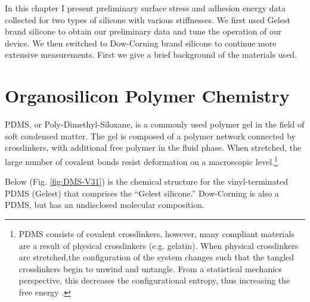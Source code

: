 In this chapter I present preliminary surface stress and adhesion energy data collected for two types of silicone with various stiffnesses. We first used Gelest brand silicone to obtain our preliminary data and tune the operation of our device. We then switched to Dow-Corning brand silicone to continue more extensive measurements. First we give a brief background of the materials used. 


\section{Organosilicon Polymer Chemistry}
\label{section:polychem}
PDMS, or Poly-Dimethyl-Siloxane, is a commonly used polymer gel in the field of soft condensed matter. The gel is composed of a polymer network connected by crosslinkers, with additional free polymer in the fluid phase. When stretched, the large number of covalent bonds resist deformation on a macroscopic level.\footnote{PDMS consists of covalent crosslinkers, however, many compliant materials are a result of physical crosslinkers (e.g. gelatin). When physical crosslinkers are stretched,the configuration of the system changes such that the tangled crosslinkers begin to unwind and untangle. From a statistical mechanics perspective, this decreases the configurational entropy, thus increasing the free energy \cite{Andreotti2020}.} 


Below (Fig. \ref{fig:DMS-V31}) is the chemical structure for the vinyl-terminated PDMS (Gelest) that comprises the ``Gelest silicone.'' Dow-Corning is also a PDMS, but has an undisclosed molecular composition.
\setatomsep{20pt}

\newcommand\setpolymerdelim[2]{\def\delimleft{#1}\def\delimright{#2}}
\def\makebraces(#1,#2)#3#4#5{%
	\edef\delimhalfdim{\the\dimexpr(#1+#2)/2}%
	\edef\delimvshift{\the\dimexpr(#1-#2)/2}%
	\chemmove{
		\node[at=(#4),yshift=(\delimvshift)]
		{$
			\left\delimleft
			\vrule height\delimhalfdim depth\delimhalfdim width0pt
			\right.
			$};
		\node[at=(#5),yshift=(\delimvshift)]
		{$
			\left.
			\vrule height\delimhalfdim depth\delimhalfdim width0pt
			\right\delimright_{\rlap{#3}}
			$};
	}%
}


